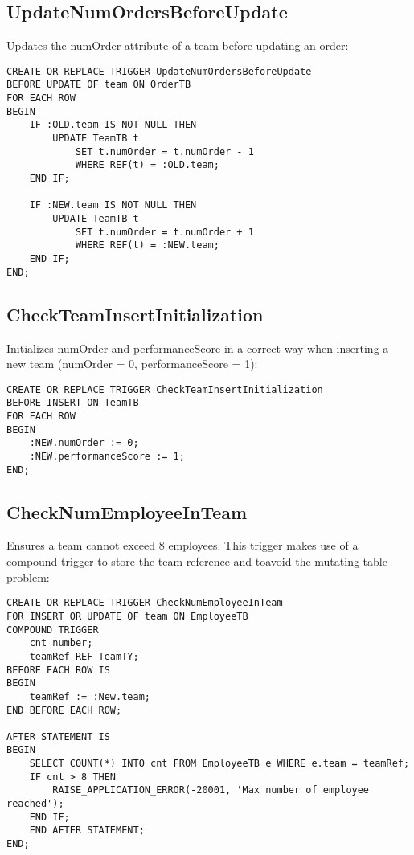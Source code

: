 \subsection*{UpdateNumOrdersBeforeUpdate}
Updates the numOrder attribute of a team before updating an order:
\begin{lstlisting}
CREATE OR REPLACE TRIGGER UpdateNumOrdersBeforeUpdate
BEFORE UPDATE OF team ON OrderTB
FOR EACH ROW
BEGIN
    IF :OLD.team IS NOT NULL THEN
        UPDATE TeamTB t
            SET t.numOrder = t.numOrder - 1
            WHERE REF(t) = :OLD.team;
    END IF;

    IF :NEW.team IS NOT NULL THEN
        UPDATE TeamTB t
            SET t.numOrder = t.numOrder + 1
            WHERE REF(t) = :NEW.team;
    END IF;
END;
\end{lstlisting}

\subsection*{CheckTeamInsertInitialization}
Initializes numOrder and performanceScore in a correct way when inserting a new team (numOrder = 0, performanceScore = 1):
\begin{lstlisting}
CREATE OR REPLACE TRIGGER CheckTeamInsertInitialization
BEFORE INSERT ON TeamTB
FOR EACH ROW
BEGIN
    :NEW.numOrder := 0;
    :NEW.performanceScore := 1;
END;
\end{lstlisting}

\subsection*{CheckNumEmployeeInTeam}
Ensures a team cannot exceed 8 employees. This trigger makes use of a compound trigger to store the team reference and toavoid the mutating table problem:
\begin{lstlisting}
CREATE OR REPLACE TRIGGER CheckNumEmployeeInTeam
FOR INSERT OR UPDATE OF team ON EmployeeTB
COMPOUND TRIGGER
    cnt number;
    teamRef REF TeamTY;
BEFORE EACH ROW IS
BEGIN
    teamRef := :New.team;
END BEFORE EACH ROW;

AFTER STATEMENT IS
BEGIN
    SELECT COUNT(*) INTO cnt FROM EmployeeTB e WHERE e.team = teamRef;
    IF cnt > 8 THEN
        RAISE_APPLICATION_ERROR(-20001, 'Max number of employee reached');
    END IF;
    END AFTER STATEMENT;
END;
\end{lstlisting}

